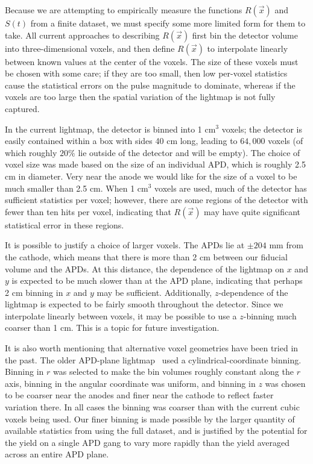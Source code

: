 Because we are attempting to empirically measure the functions $R(\vec{x})$ and $S(t)$ from a finite dataset, we must specify some more limited form for them to take.  All current approaches to describing $R(\vec{x})$ first bin the detector volume into three-dimensional voxels, and then define $R(\vec{x})$ to interpolate linearly between known values at the center of the voxels.  The size of these voxels must be chosen with some care; if they are too small, then low per-voxel statistics cause the statistical errors on the pulse magnitude to dominate, whereas if the voxels are too large then the spatial variation of the lightmap is not fully captured.

In the current lightmap, the detector is binned into 1 cm$^3$ voxels; the detector is easily contained within a box with sides 40 cm long, leading to $64,000$ voxels (of which roughly $20\%$ lie outside of the detector and will be empty).  The choice of voxel size was made based on the size of an individual APD, which is roughly 2.5 cm in diameter. Very near the anode we would like for the size of a voxel to be much smaller than 2.5 cm.  When 1 cm$^3$ voxels are used, much of the detector has sufficient statistics per voxel; however, there are some regions of the detector with fewer than ten hits per voxel, indicating that $R(\vec{x})$ may have quite significant statistical error in these regions.

It is possible to justify a choice of larger voxels.  The APDs lie at $\pm 204$ mm from the cathode, which means that there is more than 2 cm between our fiducial volume and the APDs.  At this distance, the dependence of the lightmap on $x$ and $y$ is expected to be much slower than at the APD plane, indicating that perhaps 2 cm binning in $x$ and $y$ may be sufficient.  Additionally, $z$-dependence of the lightmap is expected to be fairly smooth throughout the detector. Since we interpolate linearly between voxels, it may be possible to use a $z$-binning much coarser than 1 cm.  This is a topic for future investigation.

It is also worth mentioning that alternative voxel geometries have been tried in the past.  The older APD-plane lightmap~\cite{ThesisSteve} used a cylindrical-coordinate binning. Binning in $r$ was selected to make the bin volumes roughly constant along the $r$ axis, binning in the angular coordinate was uniform, and binning in $z$ was chosen to be coarser near the anodes and finer near the cathode to reflect faster variation there.  In all cases the binning was coarser than with the current cubic voxels being used. Our finer binning is made possible by the larger quantity of available statistics from using the full dataset, and is justified by the potential for the yield on a single APD gang to vary more rapidly than the yield averaged across an entire APD plane.

